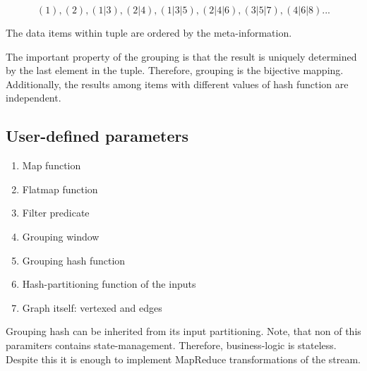 \[(1), (2), (1|3), (2|4), (1|3|5), (2|4|6), (3|5|7), (4|6|8)...\]

The data items within tuple are ordered by the meta-information. 

The important property of the grouping is that the result is uniquely determined by the last element in the tuple. Therefore, grouping is the bijective mapping. Additionally, the results among items with different values of hash function are independent.

\subsection{User-defined parameters}

\begin{enumerate}
  \item{Map function}
  \item{Flatmap function}
  \item{Filter predicate}
  \item{Grouping window}
  \item{Grouping hash function}
  \item{Hash-partitioning function of the inputs}
  \item{Graph itself: vertexed and edges}
\end{enumerate}

Grouping hash can be inherited from its input partitioning. Note, that non of this paramiters contains state-management. Therefore, business-logic is stateless. Despite this it is enough to implement MapReduce transformations of the stream.


